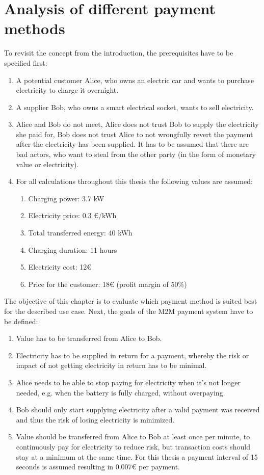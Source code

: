 \section{Analysis of different payment methods}

To revisit the concept from the introduction, the prerequisites have to be specified first:

\begin{enumerate}
    \item A potential customer Alice, who owns an electric car and wants to purchase electricity to charge it overnight.
    \item A supplier Bob, who owns a smart electrical socket, wants to sell electricity.
    \item Alice and Bob do not meet, Alice does not trust Bob to supply the electricity she paid for, Bob does not trust Alice to not wrongfully revert the payment after the electricity has been supplied. It has to be assumed that there are bad actors, who want to steal from the other party (in the form of monetary value or electricity).
    \item For all calculations throughout this thesis the following values are assumed:
    \begin{enumerate}
        \item Charging power: 3.7 kW
        \item Electricity price: 0.3 \euro/kWh
        \item Total transferred energy: 40 kWh
        \item Charging duration: 11 hours
        \item Electricity cost: 12\euro
        \item Price for the customer: 18\euro{} (profit margin of 50\%)
    \end{enumerate}
\end{enumerate}

The objective of this chapter is to evaluate which payment method is suited best for the described use case. Next, the goals of the M2M payment system have to be defined:

\begin{enumerate}
    \item Value has to be transferred from Alice to Bob.
    \item Electricity has to be supplied in return for a payment, whereby the risk or impact of not getting electricity in return has to be minimal.
    \item Alice needs to be able to stop paying for electricity when it's not longer needed, e.g. when the battery is fully charged, without overpaying.
    \item Bob should only start supplying electricity after a valid payment was received and thus the risk of losing electricity is minimized.
    \item Value should be transferred from Alice to Bob at least once per minute, to continuously pay for electricity to reduce risk, but transaction costs should stay at a minimum at the same time. For this thesis a payment interval of 15 seconds is assumed resulting in 0.007\euro{} per payment.
\end{enumerate}

